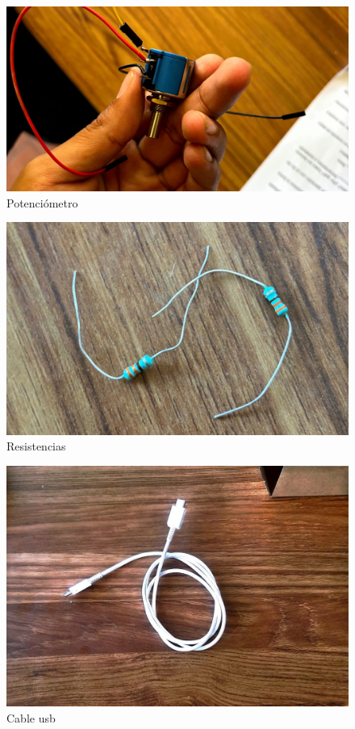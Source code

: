     \begin{figure}[H]
        \centering
        \includegraphics[trim = {70mm 1mm 70mm 1mm},clip,scale=0.2]{8/Img/Potenciometro.pdf}
        \caption{Potenciómetro}
        \label{fig:enter-label}
    \end{figure}
    
    \begin{figure}[H]
        \centering
        \includegraphics[trim = {30mm 1mm 30mm 1mm},clip,scale=0.2]{8/Img/Resistencias.pdf}
        \caption{Resistencias}
        \label{fig:enter-label}
    \end{figure}
    
    \begin{figure}[H]
        \centering
        \includegraphics[trim = {30mm 30mm 30mm 10mm},clip,scale=0.2]{8/Img/Cable usb.pdf}
        \caption{Cable usb}
        \label{fig:enter-label}
    \end{figure}
    
